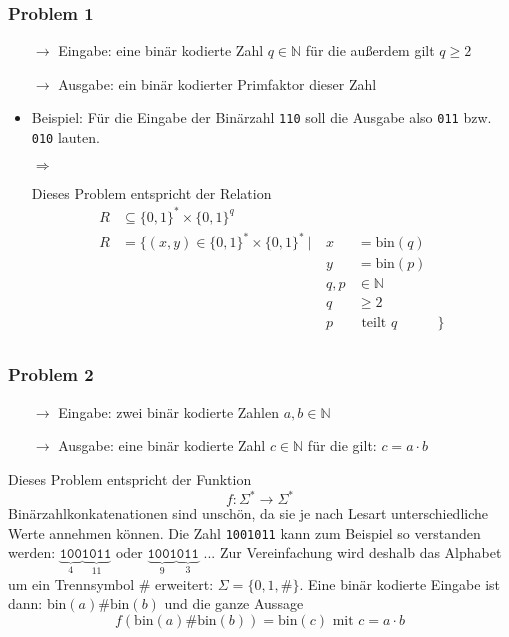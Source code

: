 \documentclass{scrartcl}%
\begin{document}
    \subsubsection*{Problem 1}
    \begin{itemize}
        \item [$\rightarrow$] Eingabe: eine binär kodierte Zahl $q \in \mathbb{N}$ für die außerdem gilt $q \geq 2$
        \item [$\rightarrow$] Ausgabe: ein binär kodierter Primfaktor dieser Zahl
        \item Beispiel: Für die Eingabe der Binärzahl \texttt{110} soll die Ausgabe also \texttt{011} bzw. \texttt{010} lauten.
        \item [$\Rightarrow$]{
        Dieses Problem entspricht der Relation
        \begin{equation*}
            \begin{align*}
                R & \subseteq \{0,1\}^*\times\{0,1\}^q \\
                R & = \{ (x,y) \in \{0,1\}^* \times \{0,1\}^* \ | \ & x&=\text{bin}(q)  \\
                && y &=\text{bin}(p) \\
                && q,p& \in \mathbb{N} \\
                && q& \geq 2 \\
                && p& \text{ teilt } q &\} \\
            \end{align*}
        \end{equation*}

        }
    \end{itemize}

    \subsubsection*{Problem 2}
    \begin{itemize}
        \item [$\rightarrow$] Eingabe: zwei binär kodierte Zahlen $a,b \in \mathbb{N}$
        \item [$\rightarrow$] Ausgabe: eine binär kodierte Zahl $c \in \mathbb{N}$ für die gilt: $c=a \cdot b$
    \end{itemize}
    Dieses Problem entspricht der Funktion
    \begin{equation*}
        \displaystyle f: \Sigma^* \rightarrow \Sigma^*
    \end{equation*}
    Binärzahlkonkatenationen sind unschön, da sie je nach Lesart unterschiedliche Werte annehmen können.
    Die Zahl \texttt{1001011} kann zum Beispiel so verstanden werden:
    $\underbrace{\texttt{100}}_{4}\underbrace{\texttt{1011}}_{11}$ oder $\underbrace{\texttt{1001}}_{9}\underbrace{\texttt{011}}_{3}$ ...
    Zur Vereinfachung wird deshalb das Alphabet um ein Trennsymbol \# erweitert: $\Sigma = \{0,1,\#\}$.
    Eine binär kodierte Eingabe ist dann: bin$(a)\#\text{bin}(b)$ und die ganze Aussage
    \begin{equation*}
        f(\text{bin}(a)\#\text{bin}(b)) = \text{bin}(c) \text{ mit } c=a\cdot b
    \end{equation*}
\end{document}
